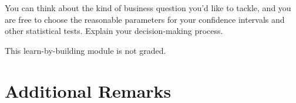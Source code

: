 \documentclass[]{article}
\begin{document}
You can think about the kind of business question you'd like to tackle,
and you are free to choose the reasonable parameters for your confidence
intervals and other statistical tests. Explain your decision-making
process.

This learn-by-building module is not graded.

\hypertarget{additional-remarks}{%
\section{Additional Remarks}\label{additional-remarks}}
\end{document}
